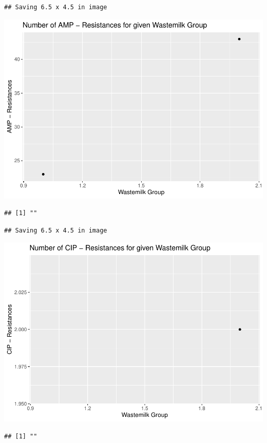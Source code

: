 \documentclass[
]{article}
\begin{document}
\begin{verbatim}
## Saving 6.5 x 4.5 in image
\end{verbatim}

\includegraphics{NResistenzen_files/figure-latex/binary_or_nominal_variables-1.pdf}

\begin{verbatim}
## [1] ""
\end{verbatim}

\begin{verbatim}
## Saving 6.5 x 4.5 in image
\end{verbatim}

\includegraphics{NResistenzen_files/figure-latex/binary_or_nominal_variables-2.pdf}

\begin{verbatim}
## [1] ""
\end{verbatim}
\end{document}
